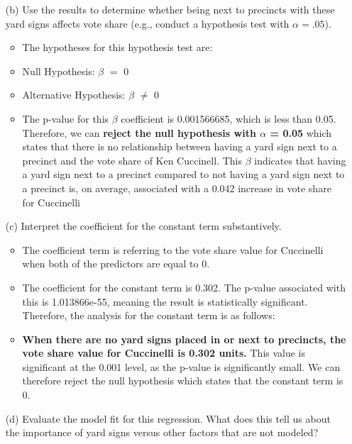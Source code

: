 \documentclass[12pt,letterpaper]{article}
\begin{document}
\begin{enumerate}
\begin{itemize}
	
\end{itemize}

			
	\item [(b)]  Use the results to determine whether being
	next to precincts with these yard signs affects vote
	share (e.g., conduct a hypothesis test with $\alpha = .05$).
	
	
\begin{itemize}
	\item The hypotheses for this hypothesis test are:
	\item {Null Hypothesis: $\beta$ $=$ 0}
	\item {Alternative Hypothesis: $\beta$ $\neq$ 0}
	\item The p-value for this $\beta$ coefficient is 0.001566685, which is less than 0.05. Therefore, we can \textbf{reject the null hypothesis with $\alpha$ = 0.05} which states that there is no relationship between having a yard sign next to a precinct and the vote share of Ken Cuccinell. This $\beta$ indicates that having a yard sign next to a precinct compared to not having a yard sign next to a precinct is, on average, associated with a 0.042 increase in vote share for Cuccinelli
	
\end{itemize}


	\item [(c)] Interpret the coefficient for the constant term substantively.
	
\begin{itemize}
	\item The coefficient term is referring to the vote share value for Cuccinelli when both of the predictors are equal to 0.
	\item The coefficient for the constant term is 0.302. The  p-value associated with this is 1.013866e-55, meaning the result is statistically significant. Therefore, the analysis for the constant term is as follows:
	\item \textbf{When there are no yard signs placed in or next to precincts, the vote share value for Cuccinelli is 0.302 units.} This value is significant at the 0.001 level, as the p-value is significantly small. We can therefore reject the null hypothesis which states that the constant term is 0.
\end{itemize}

	
	\item [(d)] Evaluate the model fit for this regression.  What does this	tell us about the importance of yard signs versus other factors that are not modeled?
	

\end{enumerate}
\end{document}
